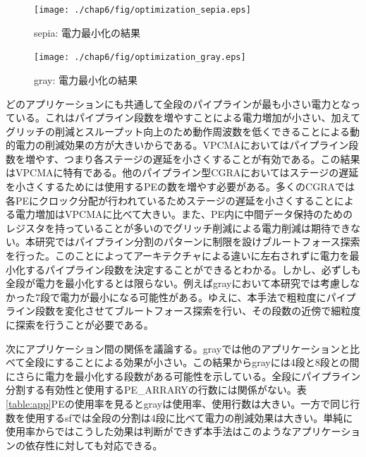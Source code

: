 {\begin{figure}[h]
\centering
\texttt{[image: ./chap6/fig/optimization\_sepia.eps]}
\caption{sepia: 電力最小化の結果}
\label{fig:optimization_sepia}
\end{figure}



\begin{figure}[h]
\centering
\texttt{[image: ./chap6/fig/optimization\_gray.eps]}
\caption{gray: 電力最小化の結果}
\label{fig:optimization_gray}
\end{figure}

どのアプリケーションにも共通して全段のパイプラインが最も小さい電力となっている。これはパイプライン段数を増やすことによる電力増加が小さい、加えてグリッチの削減とスループット向上のため動作周波数を低くできることによる動的電力の削減効果の方が大きいからである。VPCMAにおいてはパイプライン段数を増やす、つまり各ステージの遅延を小さくすることが有効である。この結果はVPCMAに特有である。他のパイプライン型CGRAにおいてはステージの遅延を小さくするためには使用するPEの数を増やす必要がある。多くのCGRAでは各PEにクロック分配が行われているためステージの遅延を小さくすることによる電力増加はVPCMAに比べて大きい。また、PE内に中間データ保持のためのレジスタを持っていることが多いのでグリッチ削減による電力削減は期待できない。本研究ではパイプライン分割のパターンに制限を設けブルートフォース探索を行った。このことによってアーキテクチャによる違いに左右されずに電力を最小化するパイプライン段数を決定することができるとわかる。しかし、必ずしも全段が電力を最小化するとは限らない。例えばgrayにおいて本研究では考慮しなかった7段で電力が最小になる可能性がある。ゆえに、本手法で粗粒度にパイプライン段数を変化させてブルートフォース探索を行い、その段数の近傍で細粒度に探索を行うことが必要である。


次にアプリケーション間の関係を議論する。grayでは他のアプリケーションと比べて全段にすることによる効果が小さい。この結果からgrayには4段と8段との間にさらに電力を最小化する段数がある可能性を示している。全段にパイプライン分割する有効性と使用するPE\_ARRARYの行数には関係がない。表\ref{table:app}PEの使用率を見るとgrayは使用率、使用行数は大きい。一方で同じ行数を使用するsfでは全段の分割は4段に比べて電力の削減効果は大きい。単純に使用率からではこうした効果は判断ができず本手法はこのようなアプリケーションの依存性に対しても対応できる。



}

